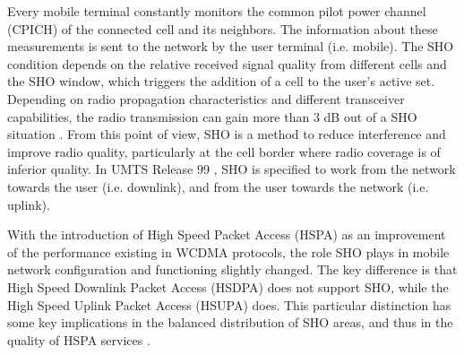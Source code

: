 Every mobile terminal constantly monitors the common pilot power channel
(CPICH) of the connected cell and its neighbors. The information about
these measurements is sent to the network by the user terminal (i.e.
mobile). The SHO condition depends on the relative received signal
quality from different cells and the SHO window, which triggers the
addition of a cell to the user's active set. Depending on radio propagation
characteristics and different transceiver capabilities, the radio
transmission can gain more than 3 dB out of a SHO situation \cite{WCDMAforUMTS_RadioAccessForThirdGenerationMobileCommunications}.
From this point of view, SHO is a method to reduce interference and
improve radio quality, particularly at the cell border where radio
coverage is of inferior quality. In UMTS Release 99 \cite{3GPP_R99},
SHO is specified to work from the network towards the user (i.e. downlink),
and from the user towards the network (i.e. uplink).

With the introduction of High Speed Packet Access (HSPA) as an improvement
of the performance existing in WCDMA protocols, the role SHO plays
in mobile network configuration and functioning slightly changed.
The key difference is that High Speed Downlink Packet Access (HSDPA)
does not support SHO, while the High Speed Uplink Packet Access (HSUPA)
does. This particular distinction has some key implications in the
balanced distribution of SHO areas, and thus in the quality of HSPA
services \cite{holma2006hsdpa}.




